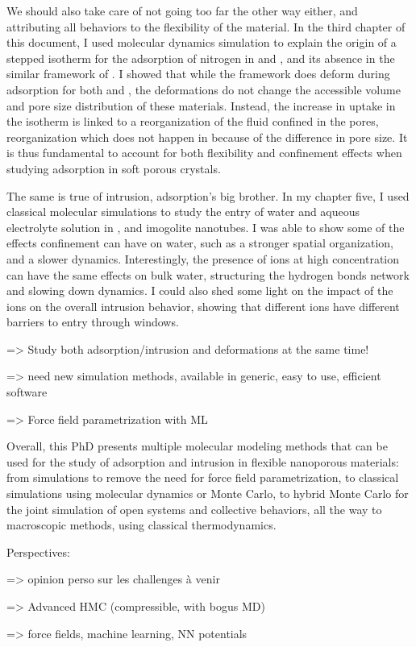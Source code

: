 We should also take care of not going too far the other way either, and
attributing all behaviors to the flexibility of the material. In the third
chapter of this document, I used \abinitio molecular dynamics simulation to
explain the origin of a stepped isotherm for the adsorption of nitrogen in
 and \ZIFCl, and its absence in the similar framework of \ZIFBr. I showed
that while the framework does deform during adsorption for both  and
\ZIFCl, the deformations do not change the accessible volume and pore size
distribution of these materials. Instead, the increase in uptake in the isotherm
is linked to a reorganization of the fluid confined in the pores, reorganization
which does not happen in \ZIFBr because of the difference in pore size. It is
thus fundamental to account for both flexibility and confinement effects when
studying adsorption in soft porous crystals.

The same is true of intrusion, adsorption's big brother. In my chapter five, I
used classical molecular simulations to study the entry of water and aqueous
electrolyte solution in , and imogolite nanotubes. I was able to show some
of the effects confinement can have on water, such as a stronger spatial
organization, and a slower dynamics. Interestingly, the presence of ions at high
concentration can have the same effects on bulk water, structuring the hydrogen
bonds network and slowing down dynamics. I could also shed some light on the
impact of the ions on the overall intrusion behavior, showing that different
ions have different barriers to entry through  windows. 


=> Study both adsorption/intrusion and deformations at the same time!

    => need new simulation methods, available in generic, easy to use, efficient software

=> Force field parametrization with ML


Overall, this PhD presents multiple molecular modeling methods that can be used
for the study of adsorption and intrusion in flexible nanoporous materials: from
\abinitio simulations to remove the need for force field parametrization, to
classical simulations using molecular dynamics or Monte Carlo, to hybrid Monte
Carlo for the joint simulation of open systems and collective behaviors, all the
way to macroscopic methods, using classical thermodynamics.

\newpage
\begin{center}
\end{center}
Perspectives:

    => opinion perso sur les challenges à venir

    => Advanced HMC (compressible, with bogus MD)

    => force fields, machine learning, NN potentials
